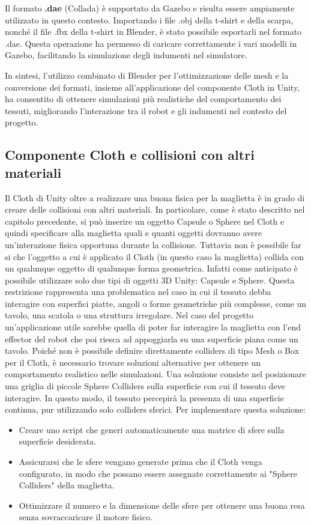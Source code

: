 \documentclass[11pt]{report}
\begin{document}
Il formato  \textbf{.dae} (Collada) è supportato da Gazebo e risulta essere ampiamente utilizzato in questo contesto. Importando i file .obj della t-shirt e della scarpa, nonché il file .fbx della t-shirt in Blender, è stato possibile esportarli nel formato .dae. Questa operazione ha permesso di caricare correttamente i vari modelli in Gazebo, facilitando la simulazione degli indumenti nel simulatore.

In sintesi, l'utilizzo combinato di Blender per l'ottimizzazione delle mesh e la conversione dei formati, insieme all'applicazione del componente Cloth in Unity, ha consentito di ottenere simulazioni più realistiche del comportamento dei tessuti, migliorando l'interazione tra il robot e gli indumenti nel contesto del progetto.

\subsection{Componente Cloth e collisioni con altri materiali}
Il Cloth di Unity oltre a realizzare una buona fisica per la maglietta è in grado di creare delle collisioni con altri materiali. In particolare, come è stato descritto nel capitolo precedente, si può inserire un oggetto Capsule o Sphere nel Cloth e quindi specificare alla maglietta quali e quanti oggetti dovranno avere un'interazione fisica opportuna durante la collisione. Tuttavia non è possibile far si che l'oggetto a cui è applicato il Cloth (in questo caso la maglietta) collida con un qualunque oggetto di qualunque forma geometrica. Infatti come anticipato è possibile utilizzare solo due tipi di oggetti 3D Unity: Capsule e Sphere. Questa restrizione rappresenta una problematica nel caso in cui il tessuto debba interagire con superfici piatte, angoli o forme geometriche più complesse, come un tavolo, una scatola o una struttura irregolare. Nel caso del progetto un'applicazione utile sarebbe quella di poter far interagire la maglietta con l'end effector del robot che poi riesca ad appoggiarla su una superficie piana come un tavolo. Poiché non è possibile definire direttamente colliders di tipo Mesh o Box per il Cloth, è necessario trovare soluzioni alternative per ottenere un comportamento realistico nelle simulazioni.
\newline
Una soluzione consiste nel posizionare una griglia di piccole Sphere Colliders sulla superficie con cui il tessuto deve interagire. In questo modo, il tessuto percepirà la presenza di una superficie continua, pur utilizzando solo colliders sferici. Per implementare questa soluzione:
\begin{itemize}
    \item Creare uno script che generi automaticamente una matrice di sfere sulla superficie desiderata.
    \item Assicurarsi che le sfere vengano generate prima che il Cloth venga configurato, in modo che possano essere assegnate correttamente ai "Sphere Colliders" della maglietta.
    \item Ottimizzare il numero e la dimensione delle sfere per ottenere una buona resa senza sovraccaricare il motore fisico.
\end{itemize}
\end{document}
